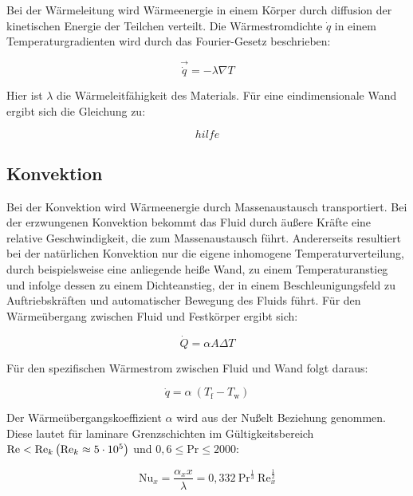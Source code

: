 Bei der Wärmeleitung wird Wärmeenergie in einem Körper durch diffusion der kinetischen Energie der Teilchen verteilt.
Die Wärmestromdichte $\dot{q}$ in einem Temperaturgradienten wird durch das Fourier-Gesetz beschrieben:

\begin{equation}
    \vec{\dot{q}} = -\lambda \nabla T
\end{equation}

Hier ist $\lambda$ die Wärmeleitfähigkeit des Materials.
Für eine eindimensionale Wand ergibt sich die Gleichung zu:

\begin{equation}
  hilfe
\end{equation}

\subsection{Konvektion}\label{sec:konvektion}

Bei der Konvektion wird Wärmeenergie durch Massenaustausch transportiert. Bei der erzwungenen Konvektion bekommt das Fluid durch äußere Kräfte
eine relative Geschwindigkeit, die zum Massenaustausch führt. Andererseits resultiert bei der natürlichen Konvektion nur die eigene
inhomogene Temperaturverteilung, durch beispielsweise eine anliegende heiße Wand, zu einem Temperaturanstieg und infolge dessen zu einem
Dichteanstieg, der in einem Beschleunigungsfeld zu Auftriebskräften und automatischer Bewegung des Fluids führt.
Für den Wärmeübergang zwischen Fluid und Festkörper ergibt sich:

\begin{equation}
    \dot{Q}=\alpha A \Delta T 
\end{equation}

Für den spezifischen Wärmestrom zwischen Fluid und Wand folgt daraus:

\begin{equation}
  \label{eq:qdot_freestream}
  \dot{q} = \alpha \ (T_\text{f} - T_\text{w})
\end{equation}

Der Wärmeübergangskoeffizient $\alpha$ wird aus der Nußelt Beziehung genommen. Diese lautet
für laminare Grenzschichten im Gültigkeitsbereich $\text{Re} < \text{Re}_k\\\left(\text{Re}_k \approx 5 \cdot 10^5\right)$ und $0,6 \leq \text{Pr} \leq 2000$:

\begin{equation}
  \label{eq:nusselt_laminar}
  \text{Nu}_x = \frac{\alpha_x x}{\lambda} = 0,332 \ \text{Pr}^{\frac{1}{3}} \ \text{Re}_x^{\frac{1}{2}}
\end{equation}


